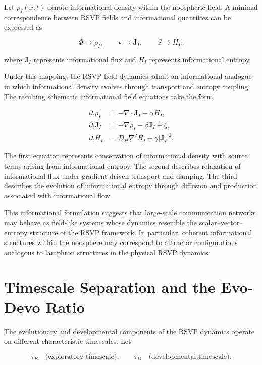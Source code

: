 \documentclass[12pt]{article}
\begin{document}
Let $\rho_I(x,t)$ denote informational density within the noospheric field. A minimal correspondence between RSVP fields and informational quantities can be expressed as

\begin{equation}
\Phi \rightarrow \rho_I,
\qquad
\mathbf{v} \rightarrow \mathbf{J}_I,
\qquad
S \rightarrow H_I ,
\end{equation}

where $\mathbf{J}_I$ represents informational flux and $H_I$ represents informational entropy.

Under this mapping, the RSVP field dynamics admit an informational analogue in which informational density evolves through transport and entropy coupling. The resulting schematic informational field equations take the form

\begin{align}
\partial_t \rho_I &= -\nabla \cdot \mathbf{J}_I + \alpha H_I, \\
\partial_t \mathbf{J}_I &= -\nabla \rho_I - \beta \mathbf{J}_I + \zeta, \\
\partial_t H_I &= D_H \nabla^2 H_I + \gamma |\mathbf{J}_I|^2 .
\end{align}

The first equation represents conservation of informational density with source terms arising from informational entropy. The second describes relaxation of informational flux under gradient-driven transport and damping. The third describes the evolution of informational entropy through diffusion and production associated with informational flow.

This informational formulation suggests that large-scale communication networks may behave as field-like systems whose dynamics resemble the scalar--vector--entropy structure of the RSVP framework. In particular, coherent informational structures within the noosphere may correspond to attractor configurations analogous to lamphron structures in the physical RSVP dynamics.

\section{Timescale Separation and the Evo-Devo Ratio}
\label{sec:timescale}

The evolutionary and developmental components of the RSVP dynamics operate on different characteristic timescales. Let

\begin{equation}
\tau_E
\quad \text{(exploratory timescale)}, 
\qquad
\tau_D
\quad \text{(developmental timescale)} .
\end{equation}
\end{document}
